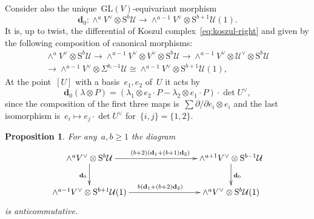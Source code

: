 \documentclass[a4paper]{article}
\newcommand{\Gr}{\mathrm{Gr}}
\newcommand{\GL}{\mathrm{GL}}
\newcommand{\cU}{\mathcal{U}}
\newcommand{\Sy}{\mathrm{S}}
\newcommand{\vn}{\mathbf{d}}
\newtheorem{proposition}[theorem]{Proposition}
\theoremstyle{remark}
\theoremstyle{definition}
\begin{document}
Consider also the unique~\(\GL(V)\)-equivariant morphism
\begin{equation*}
	\vn_0 \colon \wedge^{a} V^\vee \otimes \Sy^{b} \cU \to \wedge^{a - 1} V^\vee \otimes \Sy^{b + 1} \cU(1).
\end{equation*} 
It is, up to twist, the differential of Koszul complex~\eqref{eq:koszul-right} and given by the following composition of canonical morphisms:
\begin{multline*}
	\wedge^{a} V^\vee \otimes \Sy^{b} \cU \to 
	\wedge^{a-1} V^\vee \otimes V^\vee \otimes \Sy^{b} \cU 
	\to \wedge^{a-1} V^\vee \otimes \cU^\vee \otimes \Sy^{b} \cU \\
	\to \wedge^{a-1} V^\vee \otimes \Sigma^{b,-1} \cU 
	\cong \wedge^{a - 1} V^\vee \otimes \Sy^{b + 1} \cU(1),
\end{multline*}
At the point~\([U]\) with a basis~\(e_1, e_2\) of~\(U\) it acts by
\begin{equation}
\label{eq:def-vn0}
\vn_0(\lambda \otimes P) = (\lambda_1 \otimes e_2 \cdot P - \lambda_2 \otimes e_1 \cdot P) \cdot \det U^\vee,
\end{equation}
since the composition of the first three maps is~\(\sum \partial/\partial e_i \otimes e_i\) and the last isomorphism is~\(e_i \mapsto e_j \cdot \det U^\vee\) for~\(\{i,j\}=\{1,2\}\).

\begin{proposition}
\label{prop:bicomplex-appendix}
For any~\(a,b \ge 1\) the diagram 
\begin{equation*}
\xymatrix@C=8em{
\wedge^{a} V^\vee \otimes \Sy^{b} \cU \ar[r]^{(b + 2)(\vn_1 + (b+1)\vn_2)} \ar[d]_{\vn_0} & 
\wedge^{a + 1} V^\vee \otimes \Sy^{b - 1} \cU \ar[d]^{\vn_0}
\\
\wedge^{a - 1} V^\vee \otimes \Sy^{b + 1} \cU(1) \ar[r]^{b(\vn_1 + (b+2)\vn_2)} & 
\wedge^{a} V^\vee \otimes \Sy^{b} \cU(1) 
}
\end{equation*}
is anticommutative.
\end{proposition}
\end{document}
